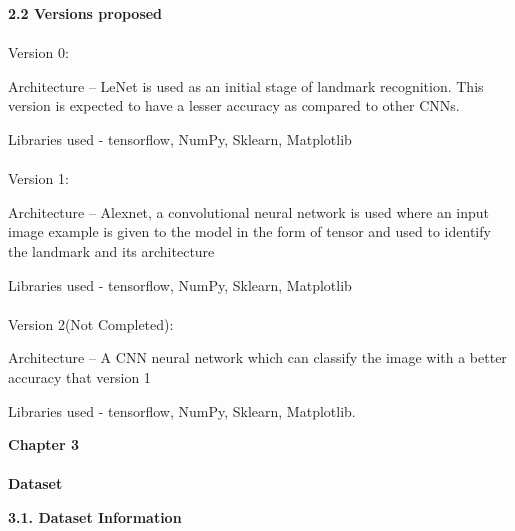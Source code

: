 \documentclass[10pt]{article} %
\begin{document}
\begin{spacing}{1.5}
\vspace{2mm}

\noindent \textbf{2.2 Versions proposed}
\paragraph{}
\noindent Version 0:

\noindent  Architecture -- LeNet is used as an initial stage of landmark recognition. This version is expected to have a lesser accuracy as compared to other CNNs.

\noindent  Libraries used - tensorflow, NumPy, Sklearn, Matplotlib
\paragraph{}
\noindent Version 1:

\noindent  Architecture -- Alexnet, a convolutional neural network is used where an input image example is given to the model in the form of tensor and used to identify the landmark and its architecture~

\noindent  Libraries used - tensorflow, NumPy, Sklearn, Matplotlib
\paragraph{}
\noindent Version 2(Not Completed):

\noindent  Architecture -- A CNN neural network which can classify the image with a better accuracy that version 1~

\noindent  Libraries used - tensorflow, NumPy, Sklearn, Matplotlib.

\noindent 

\noindent 

\noindent \textbf{}
\end{spacing}
\textbf{}
\newpage
\noindent \begin{center} \textbf{\Large Chapter 3}\end{center}
\paragraph{}
\begin{center} \textbf  {\Large Dataset} \end{center}

\textbf{}

\noindent \textbf{3.1. Dataset Information }

\noindent \textbf{}
\end{document}
